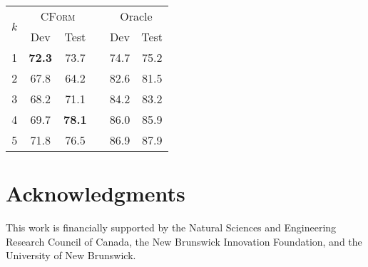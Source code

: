 \documentclass[11pt]{article}
\newcommand{\cform}{\textsc{CForm}\xspace}
\begin{document}
\begin{table*}
\centering
\begin{tabular}{cccccc} 
\hline
\multirow{2}{*}{$k$} & \multicolumn{2}{c}{\cform} & & \multicolumn{2}{c}{Oracle} \\
 & Dev & Test & & Dev & Test \\ 
\hline
1 & \textbf{72.3} & 73.7 & & 74.7 & 75.2 \\
2 & 67.8 & 64.2          & & 82.6 & 81.5 \\
3 & 68.2 & 71.1          & & 84.2 & 83.2 \\
4 & 69.7 & \textbf{78.1} & & 86.0 & 85.9 \\
5 & 71.8 & 76.5 & & 86.9 & 87.9 \\
\hline
\end{tabular}
\end{table*}


\section*{Acknowledgments}

This work is financially supported by the Natural Sciences and
Engineering Research Council of Canada, the New Brunswick Innovation
Foundation, and the University of New Brunswick.



%
%

\appendix
\end{document}
